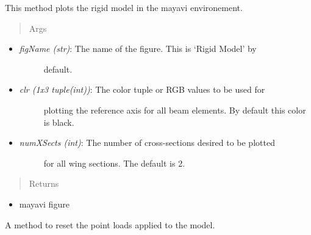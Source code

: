 \documentclass[letterpaper,10pt,english]{sphinxmanual}
\begin{document}
\begin{fulllineitems}
\begin{fulllineitems}
This method plots the rigid model in the mayavi environement.
\begin{quote}\begin{description}
\item[{Args}] \leavevmode
\end{description}\end{quote}
\begin{itemize}
\item {} \begin{description}
\item[{\emph{figName (str)}: The name of the figure. This is `Rigid Model' by}] \leavevmode
default.

\end{description}

\item {} \begin{description}
\item[{\emph{clr (1x3 tuple(int))}: The color tuple or RGB values to be used for}] \leavevmode
plotting the reference axis for all beam elements. By default this
color is black.

\end{description}

\item {} \begin{description}
\item[{\emph{numXSects (int)}: The number of cross-sections desired to be plotted}] \leavevmode
for all wing sections. The default is 2.

\end{description}

\end{itemize}
\begin{quote}\begin{description}
\item[{Returns}] \leavevmode
\end{description}\end{quote}
\begin{itemize}
\item {} 
mayavi figure

\end{itemize}

\end{fulllineitems}


\begin{fulllineitems}
\label{FEM:AeroComBAT.FEM.Model.resetPointLoads}
A method to reset the point loads applied to the model.


\end{fulllineitems}
\end{fulllineitems}
\end{document}

